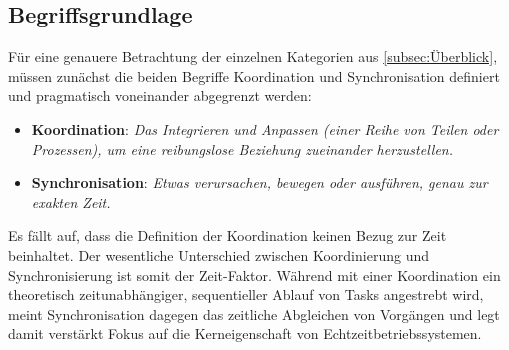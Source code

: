 \documentclass{llncs}
\begin{document}
\subsection{Begriffsgrundlage}
\label{subsec:Begriffsgrundlage}
Für eine genauere Betrachtung der einzelnen Kategorien aus \ref{subsec:Überblick}, müssen zunächst die beiden Begriffe Koordination und Synchronisation definiert und pragmatisch voneinander abgegrenzt werden:
\begin{itemize}
	\setlength\itemsep{1em} %
	\item \textbf{Koordination}: \textit{\glqq Das Integrieren und Anpassen (einer Reihe von Teilen oder Prozessen), um eine reibungslose Beziehung zueinander herzustellen.\grqq} \autocite[vgl.][80]{Cooling2017}
	\item \textbf{Synchronisation}: \textit{\glqq Etwas verursachen, bewegen oder ausführen, genau zur exakten Zeit.\grqq} \autocite[vgl.][80]{Cooling2017}
\end{itemize}
Es fällt auf, dass die Definition der Koordination keinen Bezug zur Zeit beinhaltet. Der wesentliche Unterschied zwischen Koordinierung und Synchronisierung ist somit der Zeit-Faktor. Während mit einer Koordination ein theoretisch zeitunabhängiger, sequentieller Ablauf von Tasks angestrebt wird, meint Synchronisation dagegen das zeitliche Abgleichen von Vorgängen und legt damit verstärkt Fokus auf die Kerneigenschaft von Echtzeitbetriebssystemen. 
\end{document}
